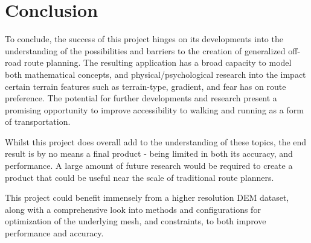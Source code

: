 \documentclass[12pt]{article}
\begin{document}
\section{Conclusion}

To conclude, the success of this project hinges on its developments into the understanding of the possibilities and barriers to the creation of generalized off-road route planning. The resulting application has a broad capacity to model both mathematical concepts, and physical/psychological research into the impact certain terrain features such as terrain-type, gradient, and fear has on route preference. The potential for further developments and research present a promising opportunity to improve accessibility to walking and running as a form of transportation.

Whilst this project does overall add to the understanding of these topics, the end result is by no means a final product - being limited in both its accuracy, and performance. A large amount of future research would be required to create a product that could be useful near the scale of traditional route planners.

This project could benefit immensely from a higher resolution DEM dataset, along with a comprehensive look into methods and configurations for optimization of the underlying mesh, and constraints, to both improve performance and accuracy.

\pagebreak

\nocite{esa2024dem}
\nocite{cgal:eb-24b}
\nocite{rouault_2022_6517191}
\nocite{wiki:osm}
\nocite{gtest}
\nocite{fmtlib}
\nocite{opencv_library}
\nocite{oneTBB}
\nocite{tin_terrain_logging}
\nocite{libboost}
\nocite{geographiclib}

\printbibliography[heading=bibnumbered]{}
\end{document}

